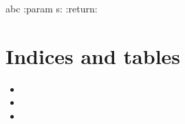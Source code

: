 \documentclass[letterpaper,10pt,english]{sphinxmanual}
\begin{document}
\begin{fulllineitems}
\begin{fulllineitems}
\label{\detokenize{models/blockobserver:models.blockobserver.SimpleEventPublisher.x}}
\sphinxAtStartPar
abc
:param s:
:return:

\end{fulllineitems}


\end{fulllineitems}



\chapter{Indices and tables}
\label{\detokenize{index:indices-and-tables}}\begin{itemize}
\item {} 
\sphinxAtStartPar
{}

\item {} 
\sphinxAtStartPar
{}

\item {} 
\sphinxAtStartPar
{}

\end{itemize}


\renewcommand{\indexname}{Python Module Index}
\begin{sphinxtheindex}
\let\bigletter\sphinxstyleindexlettergroup
\bigletter{a}
\item\relax{}
\indexspace
\bigletter{m}
\item\relax{}
\item\relax{}
\end{sphinxtheindex}

\renewcommand{\indexname}{Index}
\printindex
\end{document}
